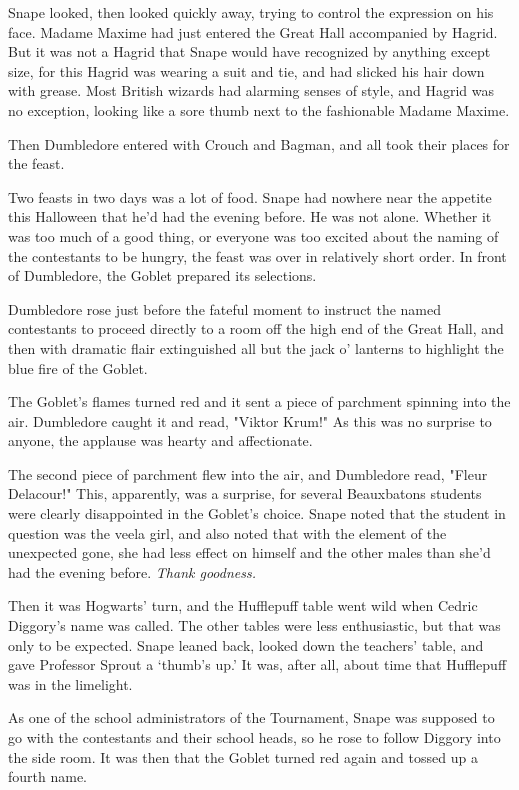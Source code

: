 Snape looked, then looked quickly away, trying to control the expression on his face. Madame Maxime had just entered the Great Hall accompanied by Hagrid. But it was not a Hagrid that Snape would have recognized by anything except size, for this Hagrid was wearing a suit and tie, and had slicked his hair down with grease. Most British wizards had alarming senses of style, and Hagrid was no exception, looking like a sore thumb next to the fashionable Madame Maxime.

Then Dumbledore entered with Crouch and Bagman, and all took their places for the feast.

Two feasts in two days was a lot of food. Snape had nowhere near the appetite this Halloween that he'd had the evening before. He was not alone. Whether it was too much of a good thing, or everyone was too excited about the naming of the contestants to be hungry, the feast was over in relatively short order. In front of Dumbledore, the Goblet prepared its selections.

Dumbledore rose just before the fateful moment to instruct the named contestants to proceed directly to a room off the high end of the Great Hall, and then with dramatic flair extinguished all but the jack o' lanterns to highlight the blue fire of the Goblet.

The Goblet's flames turned red and it sent a piece of parchment spinning into the air. Dumbledore caught it and read, "Viktor Krum!" As this was no surprise to anyone, the applause was hearty and affectionate.

The second piece of parchment flew into the air, and Dumbledore read, "Fleur Delacour!" This, apparently, was a surprise, for several Beauxbatons students were clearly disappointed in the Goblet's choice. Snape noted that the student in question was the veela girl, and also noted that with the element of the unexpected gone, she had less effect on himself and the other males than she'd had the evening before. \emph{Thank goodness.}

Then it was Hogwarts' turn, and the Hufflepuff table went wild when Cedric Diggory's name was called. The other tables were less enthusiastic, but that was only to be expected. Snape leaned back, looked down the teachers' table, and gave Professor Sprout a `thumb's up.' It was, after all, about time that Hufflepuff was in the limelight.

As one of the school administrators of the Tournament, Snape was supposed to go with the contestants and their school heads, so he rose to follow Diggory into the side room. It was then that the Goblet turned red again and tossed up a fourth name.

